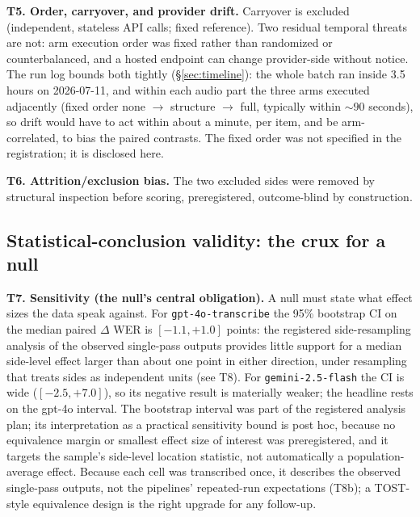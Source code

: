 \documentclass[11pt]{article}
\begin{document}
\textbf{T5. Order, carryover, and provider drift.} Carryover is excluded (independent, stateless API calls; fixed reference). Two residual temporal threats are not: arm execution order was fixed rather than randomized or counterbalanced, and a hosted endpoint can change provider-side without notice. The run log bounds both tightly (\S\ref{sec:timeline}): the whole batch ran inside 3.5 hours on 2026-07-11, and within each audio part the three arms executed adjacently (fixed order none $\rightarrow$ structure $\rightarrow$ full, typically within ${\sim}90$ seconds), so drift would have to act within about a minute, per item, and be arm-correlated, to bias the paired contrasts. The fixed order was not specified in the registration; it is disclosed here.

\textbf{T6. Attrition/exclusion bias.} The two excluded sides were removed by structural inspection before scoring, preregistered, outcome-blind by construction.

\subsection{Statistical-conclusion validity: the crux for a null}

\textbf{T7. Sensitivity (the null's central obligation).} A null must state what effect sizes the data speak against. For \texttt{gpt-4o-transcribe} the 95\% bootstrap CI on the median paired $\Delta$ WER is $[-1.1, +1.0]$ points: the registered side-resampling analysis of the observed single-pass outputs provides little support for a median side-level effect larger than about one point in either direction, under resampling that treats sides as independent units (see T8). For \texttt{gemini-2.5-flash} the CI is wide ($[-2.5, +7.0]$), so its negative result is materially weaker; the headline rests on the gpt-4o interval. The bootstrap interval was part of the registered analysis plan; its interpretation as a practical sensitivity bound is post hoc, because no equivalence margin or smallest effect size of interest was preregistered, and it targets the sample's side-level location statistic, not automatically a population-average effect. Because each cell was transcribed once, it describes the observed single-pass outputs, not the pipelines' repeated-run expectations (T8b); a TOST-style equivalence design \citep{lakens17} is the right upgrade for any follow-up.
\end{document}
